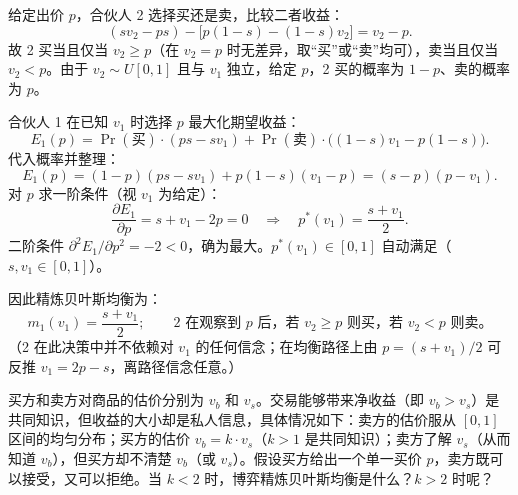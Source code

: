 
给定出价 $p$，合伙人 2 选择买还是卖，比较二者收益：
\[
  (sv_2-ps)-\bigl[p(1-s)-(1-s)v_2\bigr]=v_2-p .
\]\indent
故 2 买当且仅当 $v_2\ge p$（在 $v_2=p$ 时无差异，取“买”或“卖”均可），卖当且仅当 $v_2<p$。由于 $v_2\sim U[0,1]$ 且与 $v_1$ 独立，给定 $p$，2 买的概率为 $1-p$、卖的概率为 $p$。

合伙人 1 在已知 $v_1$ 时选择 $p$ 最大化期望收益：
\[
  E_1(p)=\Pr(\text{买})\cdot(ps-sv_1)+\Pr(\text{卖})\cdot\bigl((1-s)v_1-p(1-s)\bigr).
\]\indent
代入概率并整理：
\[
  E_1(p)=(1-p)(ps-sv_1)+p(1-s)(v_1-p)
       =(s-p)(p-v_1).
\]\indent
对 $p$ 求一阶条件（视 $v_1$ 为给定）：
\[
  \frac{\partial E_1}{\partial p}=s+v_1-2p=0
  \quad\Longrightarrow\quad
  p^*(v_1)=\frac{s+v_1}{2}.
\]\indent
二阶条件 $\partial^2 E_1/\partial p^2=-2<0$，确为最大。$p^*(v_1)\in[0,1]$ 自动满足（$s,v_1\in[0,1]$）。

因此精炼贝叶斯均衡为：
\[
  \boxed{\;m_1(v_1)=\frac{s+v_1}{2};\qquad
  \text{2 在观察到 }p\text{ 后，若 }v_2\ge p\text{ 则买，若 }v_2<p\text{ 则卖。}\;}
\]\indent
（2 在此决策中并不依赖对 $v_1$ 的任何信念；在均衡路径上由 $p=(s+v_1)/2$ 可反推 $v_1=2p-s$，离路径信念任意。）

买方和卖方对商品的估价分别为 $v_b$ 和 $v_s$。交易能够带来净收益（即 $v_b>v_s$）是共同知识，但收益的大小却是私人信息，具体情况如下：卖方的估价服从 $[0,1]$ 区间的均匀分布；买方的估价 $v_b=k\cdot v_s$（$k>1$ 是共同知识）；卖方了解 $v_s$（从而知道 $v_b$），但买方却不清楚 $v_b$（或 $v_s$）。假设买方给出一个单一买价 $p$，卖方既可以接受，又可以拒绝。当 $k<2$ 时，博弈精炼贝叶斯均衡是什么？$k>2$ 时呢？

